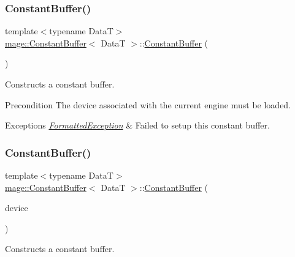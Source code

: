 \subsubsection{\texorpdfstring{Constant\+Buffer()}{ConstantBuffer()}\hspace{0.1cm}{\footnotesize\ttfamily [1/4]}}
{\footnotesize\ttfamily template$<$typename DataT$>$ \\
\hyperlink{structmage_1_1_constant_buffer}{mage\+::\+Constant\+Buffer}$<$ DataT $>$\+::\hyperlink{structmage_1_1_constant_buffer}{Constant\+Buffer} (\begin{DoxyParamCaption}{ }\end{DoxyParamCaption})}

Constructs a constant buffer.

\begin{DoxyPrecond}{Precondition}
The device associated with the current engine must be loaded. 
\end{DoxyPrecond}

\begin{DoxyExceptions}{Exceptions}
{\em \hyperlink{structmage_1_1_formatted_exception}{Formatted\+Exception}} & Failed to setup this constant buffer. \\
\hline
\end{DoxyExceptions}
\hypertarget{structmage_1_1_constant_buffer_ad2b449d2b39c7973a102e718282796dd}{}\label{structmage_1_1_constant_buffer_ad2b449d2b39c7973a102e718282796dd} 
\subsubsection{\texorpdfstring{Constant\+Buffer()}{ConstantBuffer()}\hspace{0.1cm}{\footnotesize\ttfamily [2/4]}}
{\footnotesize\ttfamily template$<$typename DataT$>$ \\
\hyperlink{structmage_1_1_constant_buffer}{mage\+::\+Constant\+Buffer}$<$ DataT $>$\+::\hyperlink{structmage_1_1_constant_buffer}{Constant\+Buffer} (\begin{DoxyParamCaption}\item[{I\+D3\+D11\+Device2 $\ast$}]{device }\end{DoxyParamCaption})\hspace{0.3cm}{\ttfamily [explicit]}}

Constructs a constant buffer.

